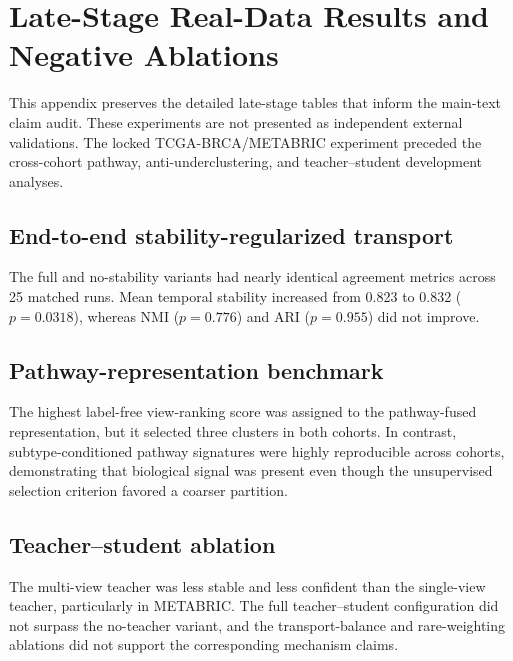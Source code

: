 \section{Late-Stage Real-Data Results and Negative Ablations}\label{app:late-results}

This appendix preserves the detailed late-stage tables that inform the main-text claim audit. These experiments are not presented as independent external validations. The locked TCGA-BRCA/METABRIC experiment preceded the cross-cohort pathway, anti-underclustering, and teacher--student development analyses.

\subsection{End-to-end stability-regularized transport}


The full and no-stability variants had nearly identical agreement metrics across 25 matched runs. Mean temporal stability increased from 0.823 to 0.832 ($p=0.0318$), whereas NMI ($p=0.776$) and ARI ($p=0.955$) did not improve.

\subsection{Pathway-representation benchmark}


The highest label-free view-ranking score was assigned to the pathway-fused representation, but it selected three clusters in both cohorts. In contrast, subtype-conditioned pathway signatures were highly reproducible across cohorts, demonstrating that biological signal was present even though the unsupervised selection criterion favored a coarser partition.

\subsection{Teacher--student ablation}


The multi-view teacher was less stable and less confident than the single-view teacher, particularly in METABRIC. The full teacher--student configuration did not surpass the no-teacher variant, and the transport-balance and rare-weighting ablations did not support the corresponding mechanism claims.
